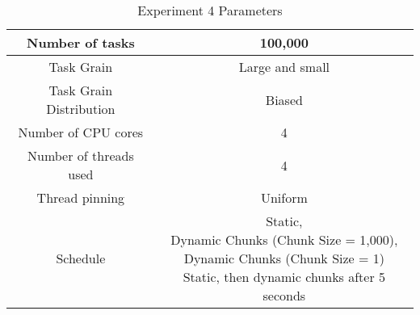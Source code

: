 \begin{table}
\centering
 \begin{tabular}{|c|c|}
  \hline
  Number of tasks & 100,000 \\
  \hline
  Task Grain & Large and small \\
  \hline
  Task Grain Distribution & Biased \\
  \hline
  Number of CPU cores & 4 \\
  \hline
  Number of threads used & 4 \\
  \hline
  Thread pinning & Uniform \\
  \hline
  Schedule & \specialcell{Static, \\ Dynamic Chunks (Chunk Size = 1,000), \\ Dynamic Chunks (Chunk Size = 1) \\ Static, then dynamic chunks after 5 seconds} \\
  \hline
 \end{tabular}
\caption{Experiment 4 Parameters}
\iflabeld
\label{table:evaluation_ex4_parameters}
\fi
{}
\end{table}
